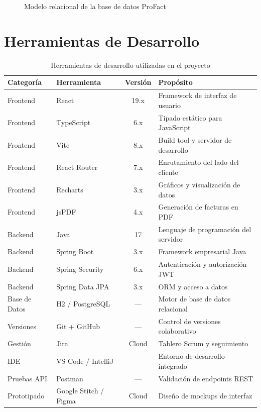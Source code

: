 \documentclass[12pt, letterpaper]{report}
\begin{document}
\begin{figure}[H]
\centering
{}
\caption{Modelo relacional de la base de datos ProFact}
\label{fig:modelo-datos}
\end{figure}

\section{Herramientas de Desarrollo}

\begin{table}[H]
\centering
\caption{Herramientas de desarrollo utilizadas en el proyecto}
\renewcommand{\arraystretch}{1.3}
\begin{tabularx}{\textwidth}{|l|l|c|X|}
\hline
\textbf{Categoría} & \textbf{Herramienta} & \textbf{Versión} & \textbf{Propósito} \\ \hline
Frontend & React & 19.x & Framework de interfaz de usuario \\ \hline
Frontend & TypeScript & 6.x & Tipado estático para JavaScript \\ \hline
Frontend & Vite & 8.x & Build tool y servidor de desarrollo \\ \hline
Frontend & React Router & 7.x & Enrutamiento del lado del cliente \\ \hline
Frontend & Recharts & 3.x & Gráficos y visualización de datos \\ \hline
Frontend & jsPDF & 4.x & Generación de facturas en PDF \\ \hline
Backend & Java & 17 & Lenguaje de programación del servidor \\ \hline
Backend & Spring Boot & 3.x & Framework empresarial Java \\ \hline
Backend & Spring Security & 6.x & Autenticación y autorización JWT \\ \hline
Backend & Spring Data JPA & 3.x & ORM y acceso a datos \\ \hline
Base de Datos & H2 / PostgreSQL & --- & Motor de base de datos relacional \\ \hline
Versiones & Git + GitHub & --- & Control de versiones colaborativo \\ \hline
Gestión & Jira & Cloud & Tablero Scrum y seguimiento \\ \hline
IDE & VS Code / IntelliJ & --- & Entorno de desarrollo integrado \\ \hline
Pruebas API & Postman & --- & Validación de endpoints REST \\ \hline
Prototipado & Google Stitch / Figma & Cloud & Diseño de mockups de interfaz \\ \hline
\end{tabularx}
\end{table}
\end{document}
